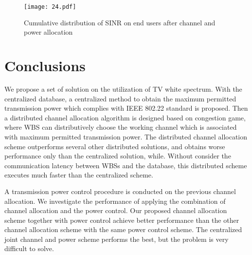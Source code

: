 


\begin{figure}[h!]
  \centering
      \texttt{[image: 24.pdf]}
  \caption{Cumulative distribution of SINR on end users after channel and power allocation}
          \label{joint_SINRcdf}
\end{figure}

\section{Conclusions}
We propose a set of solution on the utilization of TV white spectrum.
With the centralized database, a centralized method to obtain the maximum permitted transmission power which complies with IEEE 802.22 standard is proposed.
Then a distributed channel allocation algorithm is designed based on congestion game, where WBS can distributively choose the working channel which is associated with maximum permitted transmission power.
The distributed channel allocation scheme outperforms several other distributed solutions, and obtains worse performance only than the centralized solution, while.
Without consider the communication latency between WBSs and the database, this distributed scheme executes much faster than the centralized scheme.

A transmission power control procedure is conducted on the previous channel allocation.
We investigate the performance of applying the combination of channel allocation and the power control.
Our proposed channel allocation scheme together with power control achieve better performance than the other channel allocation scheme with the same power control scheme.
The centralized joint channel and power scheme performs the best, but the problem is very difficult to solve.





